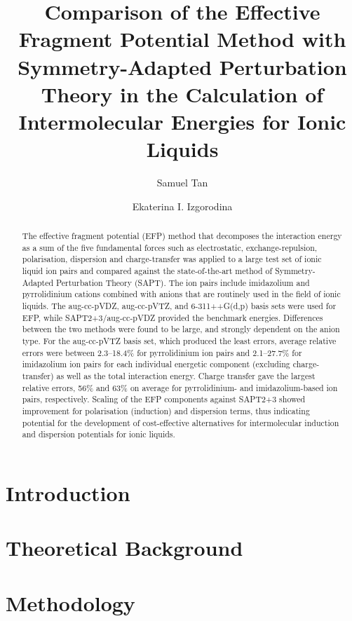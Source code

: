\documentclass[journal=jctcce]{achemso}
\title{Comparison of the Effective Fragment Potential Method with Symmetry-Adapted Perturbation Theory in the Calculation of Intermolecular Energies for Ionic Liquids}
\author{Samuel Tan}
\author{Ekaterina I. Izgorodina}
\affiliation[Monash University]
    {School of Chemistry, Monash University, 17 Rainforest Walk, Clayton, Victoria 3800, AUSTRALIA}
\newcommand{\enUnit}{kJ$ \cdot \text{mol}^{-1}$}
\newcommand{\ipair}[3]{
    \IfEqCase{#3} {
        {bfl} {\ensuremath{[ \text{C}_{\text{#2}}\text{#1}] [ \text{BF}_4 ]}}  
        {br} {\ensuremath{[ \text{C}_{\text{#2}}\text{#1}] [ \text{Br} ]}}
        {cl} {\ensuremath{[ \text{C}_{\text{#2}}\text{#1}] [ \text{Cl} ]}}
        {dca} {\ensuremath{[ \text{C}_{\text{#2}}\text{#1}] [ \text{Dca} ]}}
        {mes} {\ensuremath{[ \text{C}_{\text{#2}}\text{#1}] [ \text{Mes} ]}}
        {ntf} {\ensuremath{[ \text{C}_{\text{#2}}\text{#1}] [ \text{NTf}_{2} ]}} 
        {pf} {\ensuremath{[ \text{C}_{\text{#2}}\text{#1}] [ \text{PF}_6 ]}}
        {tos} {\ensuremath{[ \text{C}_{\text{#2}}\text{#1}] [ \text{Tos} ]}}   
    } 
    [ \PackageError{ipair}{Undefined option (anion) to ipair: #3}{} ]
}
\begin{document}
\maketitle

\begin{abstract}
    The effective fragment potential (EFP) method that decomposes the interaction energy as a sum of the five fundamental forces such as electrostatic, exchange-repulsion, polarisation, dispersion and charge-transfer was applied to a large test set of ionic liquid ion pairs and compared against the state-of-the-art method of Symmetry-Adapted Perturbation Theory (SAPT).
    The ion pairs include imidazolium and pyrrolidinium cations combined with anions that are routinely used in the field of ionic liquids.
    The aug-cc-pVDZ, aug-cc-pVTZ, and 6-311++G(d,p) basis sets were used for EFP, while SAPT2+3/aug-cc-pVDZ provided the benchmark energies.
    Differences between the two methods were found to be large, and strongly dependent on the anion type. 
    For the aug-cc-pVTZ basis set, which produced the least errors, average relative errors were between 2.3--18.4\% for pyrrolidinium ion pairs and 2.1--27.7\% for imidazolium ion pairs for each individual energetic component (excluding charge-transfer) as well as the total interaction energy.
    Charge transfer gave the largest relative errors, 56\% and 63\% on average for pyrrolidinium- and imidazolium-based ion pairs, respectively.
    Scaling of the EFP components against SAPT2+3 showed improvement for polarisation (induction) and dispersion terms, thus indicating potential for the development of cost-effective alternatives for intermolecular induction and dispersion potentials for ionic liquids. 
    
    
\end{abstract}

\section{Introduction}
\label{sec:intro}


\section{Theoretical Background}
\label{sec:bkgrd}


\section{Methodology}
\label{sec:method}

\end{document}
